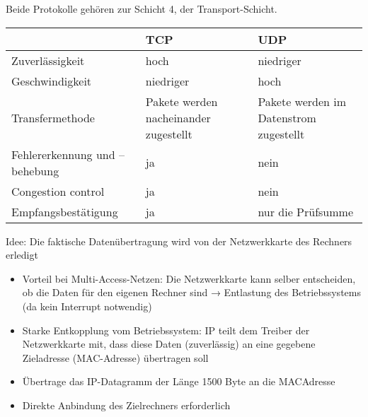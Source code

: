 Beide Protokolle gehören zur Schicht 4, der Transport-Schicht.
\bigbreak
\begin{center}
    \begin{tabularx}{\textwidth}{|X|X|X|}
        \hline
        & TCP & UDP \tabularnewline
        \hline
        Zuverlässigkeit & hoch & niedriger \tabularnewline
        \hline
        Geschwindigkeit & niedriger & hoch \tabularnewline
        \hline
        Transfermethode & Pakete werden nacheinander zugestellt & Pakete werden im Datenstrom zugestellt \tabularnewline
        \hline
        Fehlererkennung und – behebung & ja & nein \tabularnewline
        \hline
        Congestion control & ja & nein \tabularnewline
        \hline
        Empfangsbestätigung & ja & nur die Prüfsumme \tabularnewline
        \hline
    \end{tabularx}
\end{center}

Idee: Die faktische Datenübertragung wird von der Netzwerkkarte des Rechners erledigt
\begin{itemize}
    \item Vorteil bei Multi-Access-Netzen: Die Netzwerkkarte kann selber entscheiden, ob die Daten für den eigenen Rechner sind
    → Entlastung des Betriebssystems (da kein Interrupt notwendig)
    \item Starke Entkopplung vom Betriebssystem: IP teilt dem Treiber der Netzwerkkarte mit, dass diese Daten (zuverlässig) an eine gegebene Zieladresse (MAC-Adresse) übertragen soll
    \item Übertrage das IP-Datagramm der Länge 1500 Byte an die MACAdresse
    \item Direkte Anbindung des Zielrechners erforderlich
\end{itemize}